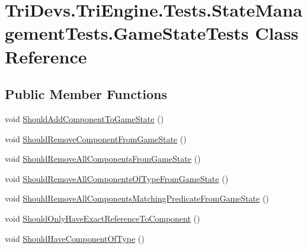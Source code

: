 \hypertarget{class_tri_devs_1_1_tri_engine_1_1_tests_1_1_state_management_tests_1_1_game_state_tests}{\section{Tri\-Devs.\-Tri\-Engine.\-Tests.\-State\-Management\-Tests.\-Game\-State\-Tests Class Reference}
\label{class_tri_devs_1_1_tri_engine_1_1_tests_1_1_state_management_tests_1_1_game_state_tests}
}
\subsection*{Public Member Functions}
\begin{DoxyCompactItemize}
\item 
void \hyperlink{class_tri_devs_1_1_tri_engine_1_1_tests_1_1_state_management_tests_1_1_game_state_tests_a841538b7dae7972981229471ce9d9a6c}{Should\-Add\-Component\-To\-Game\-State} ()
\item 
void \hyperlink{class_tri_devs_1_1_tri_engine_1_1_tests_1_1_state_management_tests_1_1_game_state_tests_a8ca615499f374f70c1e041ffd06955fd}{Should\-Remove\-Component\-From\-Game\-State} ()
\item 
void \hyperlink{class_tri_devs_1_1_tri_engine_1_1_tests_1_1_state_management_tests_1_1_game_state_tests_ae1b8a1233bdd034a6ca83ac3e12b68a4}{Should\-Remove\-All\-Components\-From\-Game\-State} ()
\item 
void \hyperlink{class_tri_devs_1_1_tri_engine_1_1_tests_1_1_state_management_tests_1_1_game_state_tests_a3c59a601dd24b58015301a9e7e7767db}{Should\-Remove\-All\-Components\-Of\-Type\-From\-Game\-State} ()
\item 
void \hyperlink{class_tri_devs_1_1_tri_engine_1_1_tests_1_1_state_management_tests_1_1_game_state_tests_a66ea115cd3c380e4ad8738bd40393a08}{Should\-Remove\-All\-Components\-Matching\-Predicate\-From\-Game\-State} ()
\item 
void \hyperlink{class_tri_devs_1_1_tri_engine_1_1_tests_1_1_state_management_tests_1_1_game_state_tests_a5fe0cfb0118f26a43891a2d644d978e9}{Should\-Only\-Have\-Exact\-Reference\-To\-Component} ()
\item 
void \hyperlink{class_tri_devs_1_1_tri_engine_1_1_tests_1_1_state_management_tests_1_1_game_state_tests_aa60a926b77a58f5551f845c2afd0a37c}{Should\-Have\-Component\-Of\-Type} ()
\item 

\end{DoxyCompactItemize}
